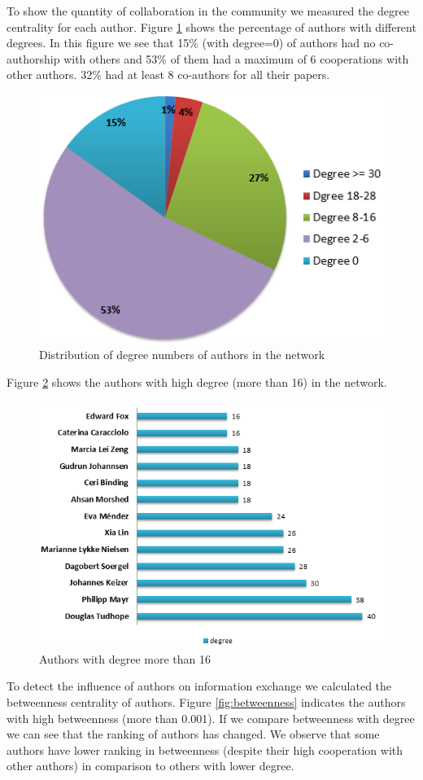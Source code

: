 \documentclass[runningheads,a4paper]{llncs}
\begin{document}
To show the quantity of collaboration in the community we measured the degree centrality for each author. Figure \ref{fig:degreePercentage} shows the percentage of authors with different degrees. In this figure we see that 15\% (with degree=0) of authors had no co-authorship with others and 53\% of them had a maximum of 6 cooperations with other authors. 32\% had at least 8 co-authors for all their papers.

\begin{figure}[H]
	\centering
	\includegraphics[width=0.6\linewidth]{degreePercentage}
	\caption{Distribution of degree numbers of authors in the network} 
	\label{fig:degreePercentage}
\end{figure}

Figure \ref{fig:degree16} shows the authors with high degree (more than 16) in the network. 

\begin{figure}[H]
	\centering
	\includegraphics[width=0.8\linewidth]{degree16}
	\caption{Authors with degree more than 16}
	\label{fig:degree16}
\end{figure}


To detect the influence of authors on information exchange we calculated the betweenness centrality of authors. Figure \ref{fig:betweenness} indicates the authors with high betweenness (more than 0.001). If we compare betweenness with degree we can see that the ranking of authors has changed. We observe that some authors have lower ranking in betweenness (despite their high cooperation with other authors) in comparison to others with lower degree. 
\end{document}
